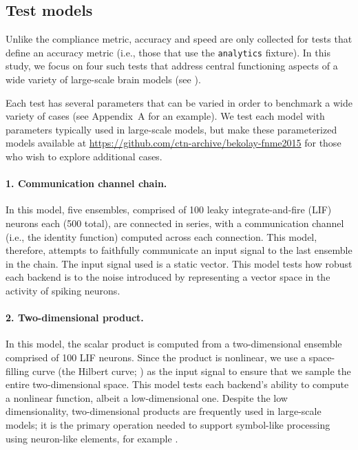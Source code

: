 \documentclass{frontiersSCNS}
\begin{document}
\subsection{Test models}

Unlike the compliance metric,
accuracy and speed are only collected
for tests that define an accuracy metric
(i.e., those that use the \texttt{analytics} fixture).
In this study, we focus on four such tests
that address central functioning aspects
of a wide variety of large-scale brain models
(see \citealp{eliasmith2003a,eliasmith2013}).

Each test has several parameters
that can be varied
in order to benchmark a wide variety of cases
(see Appendix~A for an example).
We test each model with parameters
typically used in large-scale models,
but make these parameterized models
available at \url{https://github.com/ctn-archive/bekolay-fnme2015}
for those who wish to explore additional cases.

\paragraph{1. Communication channel chain.}
In this model,
five ensembles,
comprised of 100 leaky integrate-and-fire (LIF) neurons each
(500 total),
are connected in series,
with a communication channel
(i.e., the identity function)
computed across each connection.
This model, therefore, attempts to faithfully
communicate an input signal to
the last ensemble in the chain.
The input signal used is a static vector.
This model tests how
robust each backend is to the noise introduced
by representing a vector space
in the activity of spiking neurons.

\paragraph{2. Two-dimensional product.}
In this model,
the scalar product is computed
from a two-dimensional ensemble
comprised of 100 LIF neurons.
Since the product is nonlinear,
we use a space-filling curve
(the Hilbert curve; \citealp{hilbert1891})
as the input signal to ensure that
we sample the entire two-dimensional space.
This model tests each backend's
ability to compute a nonlinear function,
albeit a low-dimensional one.
Despite the low dimensionality,
two-dimensional products are frequently used
in large-scale models;
it is the primary operation needed to support
symbol-like processing using neuron-like elements,
for example \citep{eliasmith2013}.
\end{document}
